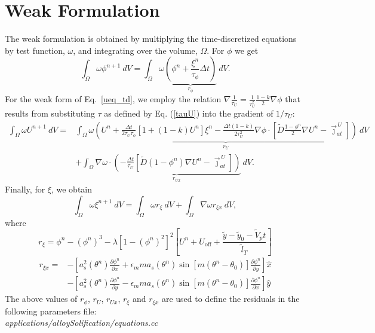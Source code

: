 \documentclass[10pt]{article}
\begin{document}
\section{Weak Formulation}
The weak formulation is obtained by multiplying the time-discretized equations by test function, $\omega$, and integrating over the volume, $\Omega$. For $\phi$ we get
\begin{equation}
\int_{\Omega}   \omega  \phi^{n+1}  ~dV = \int_{\Omega}   \omega \underbrace{\left(\phi^n + \frac{ \xi^n}{\tau_\phi}\Delta t\right)}_{r_{\phi}} ~dV.
\end{equation}
For the weak form of Eq.~\ref{ueq_td}, we employ the relation $\nabla \frac{1}{\tau_U}=\frac{1}{\tau_U^2}\frac{1-k}{2}\nabla\phi$ that results from substituting $\tau$ as defined by Eq. (\ref{tauU}) into the gradient of $1/\tau_U$:
\begin{equation}
\begin{split}
\int_{\Omega}   \omega  U^{n+1}  ~dV =& 
\int_{\Omega} \omega \underbrace{ \left( U^{n} + \frac{\Delta t}{2\tau_U\tau_\phi}[1+(1-k)U^n]\xi^n  - \frac{\Delta t (1-k)}{2\tau_U^2} \nabla \phi \cdot \left[\tilde{D}\frac{1-\phi^n}{2}\nabla U^n-\vec{\jmath}_{at}^{\,U}\right] \right) }_{r_U}~dV\\
&+\int_{\Omega}  \nabla  \omega  \cdot \underbrace{\left( -\frac{\Delta t}{\tau_U}\left[\tilde{D}(1-\phi^n)\nabla U^n-\vec{\jmath}_{at}^{\,U}\right] \right)}_{r_{Ux}}~dV.
\end{split}
\end{equation}
Finally, for $\xi$, we obtain
\begin{equation}
\int_{\Omega}   \omega \xi^{n+1} ~dV =\int_{\Omega} \omega r_\xi ~dV + \int_{\Omega} \nabla \omega r_{\xi x} ~dV,
\end{equation}
where
\begin{equation}
r_\xi= \phi^n-(\phi^n)^3 - \lambda \left[1-(\phi^n)^2\right]^2 \left[ U^n + U_\text{off} + \frac{\tilde{y} - \tilde{y}_0 - \tilde{V}_p t}{\tilde{l}_T} \right]
\end{equation}
\begin{equation}
\begin{split}
r_{\xi x}= &-\left[a_s^2(\theta^n) \frac{\partial \phi^n}{\partial x} + \epsilon_m m a_s(\theta^n) \sin \left[ m \left(\theta^n - \theta_0 \right) \right] \frac{\partial \phi^n}{\partial y}\right]\hat{x}\\
&-\left[a_s^2(\theta^n) \frac{\partial \phi^n}{\partial y} - \epsilon_m m a_s(\theta^n) \sin \left[ m \left(\theta^n - \theta_0 \right) \right] \frac{\partial \phi^n}{\partial x}\right]\hat{y}
\end{split}
\end{equation}
\vskip 0.25in
The above values of $r_{\phi}$, $r_{U}$, $r_{Ux}$,  $r_{\xi}$ and  $r_{\xi x}$ are used to define the residuals in the following parameters file: \\
\textit{applications/alloySolification/equations.cc}
\end{document}

